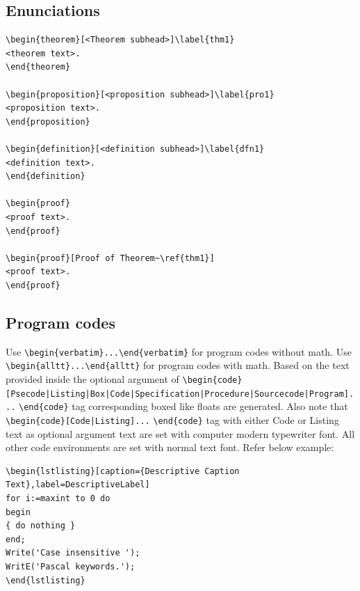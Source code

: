 \documentclass[ACS,STIX1COL]{WileyNJD-v2}
\begin{document}
\subsection{Enunciations}

\begin{verbatim}
\begin{theorem}[<Theorem subhead>]\label{thm1}
<theorem text>. 
\end{theorem}

\begin{proposition}[<proposition subhead>]\label{pro1}
<proposition text>. 
\end{proposition}

\begin{definition}[<definition subhead>]\label{dfn1}
<definition text>. 
\end{definition}

\begin{proof}
<proof text>. 
\end{proof}

\begin{proof}[Proof of Theorem~\ref{thm1}]
<proof text>.
\end{proof}

\end{verbatim}

\subsection{Program codes}

Use \verb+\begin{verbatim}...\end{verbatim}+ for program codes without math. Use \verb+\begin{alltt}...\end{alltt}+ for program codes with math. Based on the text provided inside the optional argument of \verb+\begin{code}[Psecode|Listing|Box|Code|+\hfill\break \verb+Specification|Procedure|Sourcecode|Program]...+ \verb+\end{code}+ tag corresponding boxed like floats are generated. Also note that \verb+\begin{code}[Code|Listing]...+ \verb+\end{code}+ tag with either Code or Listing text as optional argument text are set with computer modern typewriter font.  All other code environments are set with normal text font. Refer below example:

\begin{verbatim}
\begin{lstlisting}[caption={Descriptive Caption Text},label=DescriptiveLabel]
for i:=maxint to 0 do
begin
{ do nothing }
end;
Write('Case insensitive ');
WritE('Pascal keywords.');
\end{lstlisting}
\end{verbatim}
\end{document}
